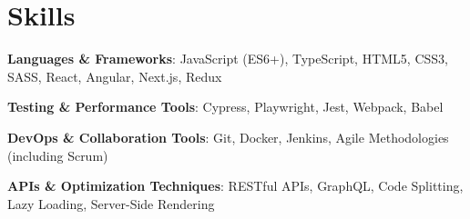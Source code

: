 \documentclass[letterpaper,11pt]{article}
\begin{document}
\section{Skills}
\begin{itemize}[leftmargin=0.15in, label={}, itemsep=1pt, parsep=1pt] %
  \small{\item{
        \textbf{Languages \& Frameworks}{: JavaScript (ES6+), TypeScript, HTML5, CSS3, SASS, React, Angular, Next.js, Redux}
        }}
        \small{\item{
        \textbf{Testing \& Performance Tools}{: Cypress, Playwright, Jest, Webpack, Babel}
        }}
        \small{\item{
        \textbf{DevOps \& Collaboration Tools}{: Git, Docker, Jenkins, Agile Methodologies (including Scrum)}
        }}
        \small{\item{
        \textbf{APIs \& Optimization Techniques}{: RESTful APIs, GraphQL, Code Splitting, Lazy Loading, Server-Side Rendering}
        }}
\end{itemize}
\end{document}

